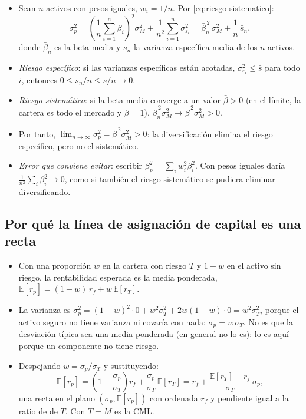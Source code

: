 \documentclass[11pt]{article}
\begin{document}
\begin{itemize}
\item Sean $n$ activos con pesos iguales, $w_i=1/n$. Por \eqref{eq:riesgo-sistematico}:
  \[
  \sigma_p^2=\left(\frac1n\sum_{i=1}^{n}\beta_i\right)^2\sigma_M^2+\frac1{n^2}\sum_{i=1}^{n}\sigma_{\varepsilon_i}^2=\bar\beta_n^{\,2}\,\sigma_M^2+\frac1n\,\bar s_n,
  \]
  donde $\bar\beta_n$ es la beta media y $\bar s_n$ la varianza específica media de los $n$ activos.
\item \emph{Riesgo específico}: si las varianzas específicas están acotadas, $\sigma_{\varepsilon_i}^2\leq\bar s$ para todo $i$, entonces $0\leq\bar s_n/n\leq\bar s/n\to0$.
\item \emph{Riesgo sistemático}: si la beta media converge a un valor $\bar\beta>0$ (en el límite, la cartera es todo el mercado y $\bar\beta=1$), $\bar\beta_n^{\,2}\sigma_M^2\to\bar\beta^{\,2}\sigma_M^2>0$.
\item Por tanto, $\lim_{n\to\infty}\sigma_p^2=\bar\beta^{\,2}\sigma_M^2>0$: la diversificación elimina el riesgo específico, pero no el sistemático. \findemo
\item \emph{Error que conviene evitar}: escribir $\beta_p^2=\sum_iw_i^2\beta_i^2$. Con pesos iguales daría $\frac1{n^2}\sum_i\beta_i^2\to0$, como si también el riesgo sistemático se pudiera eliminar diversificando.
\end{itemize}

\subsection{Por qué la línea de asignación de capital es una recta}\label{anexo:cml-recta}

\begin{itemize}
\item Con una proporción $w$ en la cartera con riesgo $T$ y $1-w$ en el activo sin riesgo, la rentabilidad esperada es la media ponderada, $\mathbb{E}[r_p]=(1-w)\,r_f+w\,\mathbb{E}[r_T]$.
\item La varianza es $\sigma_p^2=(1-w)^2\cdot0+w^2\sigma_T^2+2w(1-w)\cdot0=w^2\sigma_T^2$, porque el activo seguro no tiene varianza ni covaría con nada: $\sigma_p=w\,\sigma_T$. No es que la desviación típica sea una media ponderada (en general no lo es): lo es aquí porque un componente no tiene riesgo.
\item Despejando $w=\sigma_p/\sigma_T$ y sustituyendo:
  \[
  \mathbb{E}[r_p]=\left(1-\frac{\sigma_p}{\sigma_T}\right)r_f+\frac{\sigma_p}{\sigma_T}\,\mathbb{E}[r_T]=r_f+\frac{\mathbb{E}[r_T]-r_f}{\sigma_T}\,\sigma_p,
  \]
  una recta en el plano $(\sigma_p,\mathbb{E}[r_p])$ con ordenada $r_f$ y pendiente igual a la ratio de  de $T$. Con $T=M$ es la CML. \findemo
\end{itemize}
\end{document}
